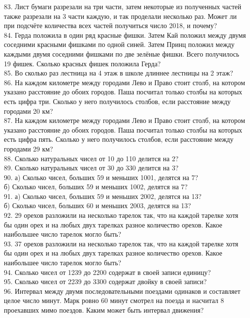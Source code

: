 \documentclass[12pt]{article}
\begin{document}
83. Лист бумаги разрезали на три части, затем некоторые из полученных частей также разрезали на 3 части каждую, и так проделали несколько раз. Может ли при подсчёте количества всех частей получиться число 2018, и почему?\\
84. Герда положила в один ряд красные фишки. Затем Кай положил между двумя соседними красными фишками по одной синей. Затем Принц положил между каждыми двумя соседними фишками по две зелёные фишки. Всего получилось 19 фишек. Сколько красных фишек положила Герда?\\
85. Во сколько раз лестница на 4 этаж в школе длиннее лестницы на 2 этаж?\\
86. На каждом километре между городами Лево и Право стоит столб, на котором указано расстояние до обоих городов. Паша посчитал только столбы на которых есть цифра три. Сколько у него получилось столбов, если расстояние между городами 20 км?\\
87. На каждом километре между городами Лево и Право стоит столб, на котором указано расстояние до обоих городов. Паша посчитал только столбы на которых есть цифра пять. Сколько у него получилось столбов, если расстояние между городами 29 км?\\
88. Сколько натуральных чисел от 10 до 110 делится на 2?\\
89. Сколько натуральных чисел от 30 до 330 делится на 3?\\
90. а) Сколько чисел, больших 59 и меньших 1001, делятся на 7?\\
б) Сколько чисел, больших 59 и меньших 1002, делятся на 7?\\
91. а) Сколько чисел, больших 59 и меньших 2002, делятся на 13?\\
б) Сколько чисел, больших 60 и меньших 2003, делятся на 13?\\
92. 29 орехов разложили на несколько тарелок так, что на каждой тарелке хотя бы один орех и на любых двух тарелках разное количество орехов. Какое наибольшее число тарелок могло быть?\\
93. 37 орехов разложили на несколько тарелок так, что на каждой тарелке хотя бы один орех и на любых двух тарелках разное количество орехов. Какое наибольшее число тарелок могло быть?\\
94. Сколько чисел от 1239 до 2200 содержат в своей записи единицу?\\
95. Сколько чисел от 2239 до 3300 содержат двойку в своей записи?\\
96. Интервал между двумя последовательными поездами одинаков и составляет целое число минут. Марк ровно 60 минут смотрел на поезда и насчитал 8 проехавших мимо поездов. Каким может быть интервал движения?\\
\end{document}
